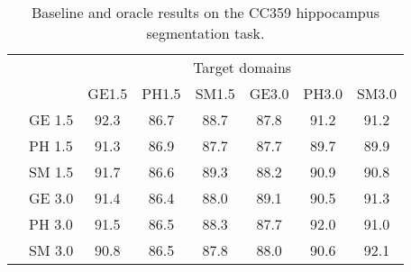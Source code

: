 \begin{table}[h]
	\centering
	\caption{Baseline and oracle results on the CC359 hippocampus segmentation task.}
	\label{tab:hippo}
			
		\begin{tabular}{|c|l||c|c|c|c|c|c|} 
			\hline
			\multicolumn{2}{|l||}{\multirow{2}{*}{}}  & \multicolumn{6}{c|}{Target domains}\\ 
			\cline{3-8}
			\multicolumn{2}{|l||}{} & GE1.5 & PH1.5 & SM1.5 & GE3.0 & PH3.0 & SM3.0 \\ 
			\hline
			\hline
			
			
			\multirow{6}{*}{{\rotatebox[origin=c]{90}{Source domains}}}
			& GE 1.5 & 92.3 & 86.7 & 88.7 & 87.8 & 91.2 & 91.2 \\
			\cline{2-8}
			
			& PH 1.5 & 91.3 & 86.9 & 87.7 & 87.7 & 89.7 & 89.9 \\
			\cline{2-8}
			
			& SM 1.5 & 91.7 & 86.6 & 89.3 & 88.2 & 90.9 & 90.8 \\
			\cline{2-8}
			
			& GE 3.0 & 91.4 & 86.4 & 88.0 & 89.1 & 90.5 & 91.3 \\
			\cline{2-8}
			
			& PH 3.0 & 91.5 & 86.5 & 88.3 & 87.7 & 92.0 & 91.0 \\
			\cline{2-8}
			
			& SM 3.0 & 90.8 & 86.5 & 87.8 & 88.0 & 90.6 & 92.1 \\
			\hline
			
	\end{tabular}%
\end{table}
